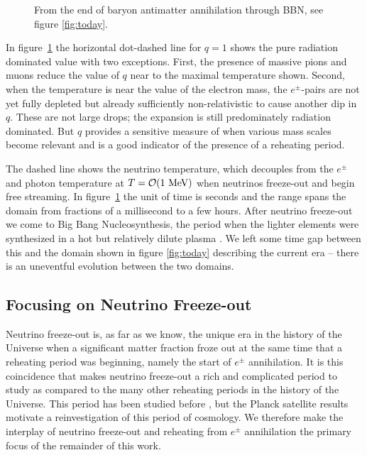 \begin{figure}
\begin{minipage}{\linewidth}
\caption{From the end of baryon antimatter annihilation through BBN, see figure \ref{fig:today}.%
\label{fig:BBN}  }
\end{minipage}
\end{figure}

 In figure~\ref{fig:BBN} the horizontal dot-dashed line for $q=1$  shows the pure radiation dominated value with two exceptions. First, the presence of massive pions  and muons reduce  the value of $q$ near to the maximal temperature shown.  Second, when the temperature is near the value of the electron mass, the $e^\pm$-pairs are not yet fully depleted but already sufficiently non-relativistic to cause another dip in $q$.  These are not large drops; the expansion is still predominately radiation dominated.  But $q$ provides a sensitive measure of when various mass scales become relevant and is a good indicator of the presence of a reheating period.

 The dashed line shows the neutrino temperature, which decouples from the $e^\pm$ and photon temperature at $T={\cal O}(1\MeV)$ when neutrinos freeze-out and begin free streaming. In figure~\ref{fig:BBN} the unit of time is seconds and the range spans the domain from fractions of a millisecond to a few hours. After neutrino freeze-out we come to Big Bang Nucleosynthesis, the period when the lighter elements were synthesized in a hot but relatively dilute plasma \cite{Iocco:2008va}. We left some time gap between this and the domain shown in figure \ref{fig:today}  describing the current era -- there is an uneventful evolution between the two domains. 

\subsection{Focusing on Neutrino Freeze-out}
Neutrino freeze-out is, as far as we know, the unique era in the history of the Universe when a significant matter fraction froze out at the same time that a reheating period was beginning, namely the start of $e^\pm$ annihilation.  It is this coincidence that makes neutrino freeze-out a rich and complicated period to study as compared to the many other reheating periods in the history of the Universe. This period has been studied before \cite{Madsen,Dolgov_Hansen,Gnedin,Esposito2000,Mangano2002,Mangano2005}, but the Planck satellite results \cite{Planck} motivate a reinvestigation of this period of cosmology.  We therefore make the interplay of neutrino freeze-out and reheating from $e^\pm$ annihilation the primary focus of the remainder of this work.

